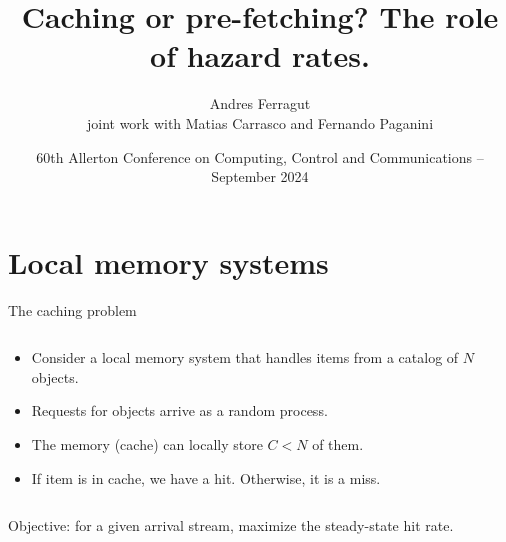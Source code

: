 \documentclass[aspectratio=169]{beamer}
\title{Caching or pre-fetching? The role of hazard rates.}
\author[Andres Ferragut, Universidad ORT Uruguay]{Andres Ferragut\\[.6em] \normalsize joint work with Matias Carrasco and Fernando Paganini}
\institute{Universidad ORT Uruguay}
\date[Allerton 2024 -- UIUC]{60th Allerton Conference on Computing, Control and Communications -- September 2024}
\newenvironment*{myitem}[1][1.5em]{\begin{itemize}\setlength{\itemsep}{#1}}{\end{itemize}}
\begin{document}
\frame[plain]{\titlepage}


\section{Local memory systems}

\begin{frame}{The caching problem}
	
	\begin{columns}
		\begin{column}{0.61\textwidth}
			\begin{myitem}[2em]
				\item Consider a \alert{local memory system} that handles items from a catalog of $N$ objects.
				\item Requests for objects arrive as a random process.
				\item The memory (cache) can locally store $C<N$ of them.
				\item If item is in cache, we have a \alert{hit}. Otherwise, it is a \alert{miss}.
			\end{myitem}
		\end{column}
		\begin{column}{0.39\textwidth}
			\centering
			
		\end{column}
	\end{columns}

	\vfill

	\centering
	\alert{Objective:} for a given arrival stream, maximize the steady-state \alert{hit rate}.
\end{frame}
\end{document}
